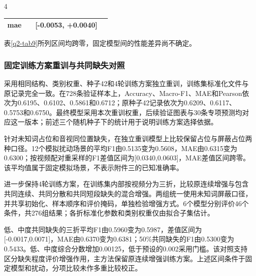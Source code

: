 \begin{PaperTable}{4}
\begin{table}[!htbp]
\begin{tabular}{@{}llll@{}}
\begin{minipage}[t]{\dimexpr 0.170000\linewidth-1.020000\tabcolsep\relax}
mae\strut
\end{minipage} & \begin{minipage}[t]{\dimexpr 0.160000\linewidth-0.960000\tabcolsep\relax}\raggedleft
-0.0007\strut
\end{minipage} & \begin{minipage}[t]{\dimexpr 0.380000\linewidth-2.280000\tabcolsep\relax}\raggedright
{[}-0.0053, +0.0040{]}\strut
\end{minipage}\tabularnewline
\bottomrule
\end{tabular}
\end{table}

\end{PaperTable}

表\ref{q2-tab9}所列区间均跨零，固定模型间的性能差异尚不确定。

\hypertarget{q2-ux56faux5b9aux8badux7ec3ux65b9ux6848ux91cdux8badux4e0eux5171ux540cux7f3aux5931ux5bf9ux7167}{%
\subsubsection{固定训练方案重训与共同缺失对照}\label{q2-ux56faux5b9aux8badux7ec3ux65b9ux6848ux91cdux8badux4e0eux5171ux540cux7f3aux5931ux5bf9ux7167}}

采用相同结构、类别权重、种子42和4轮训练方案独立重训，训练集标准化文件与原记录完全一致。在728条验证样本上，Accuracy、Macro-F1、MAE和Pearson依次为0.6195、0.6102、0.5861和0.6712；原种子42记录依次为0.6209、0.6117、0.5753和0.6750。最终模型采用本次重训权重，后续验证图表与30条专项预测均对应这一版本；前述三个随机种子下的统计用于说明训练方案选择依据。

针对未知词占位和音视同位置缺失，在独立重训模型上比较保留占位与屏蔽占位两种口径。12个模拟扰动场景的平均F1由0.5135变为0.5608，MAE由0.6315变为0.6300；按视频配对重采样的F1差值区间为{[}0.0340,0.0603{]}，MAE差值区间跨零。该平均值属于固定模拟场景，不表示附件三的已知准确率。

进一步保持4轮训练方案，在训练集内部按视频分为三折，比较原连续增强与包含共同连续、共同分散和共同短段缺失的混合增强。两组统一使用未知词屏蔽口径，并共享初始化、样本顺序和评价掩码，单独检验增强方式。6个模型分别评价46个条件，共276组结果；各折标准化参数和类别权重仅由拟合子集估计。

低、中度共同缺失的三折平均F1由0.5960变为0.5987，差值区间为{[}-0.0017,0.0071{]}，MAE由0.6370变为0.6381；50\%共同缺失的F1由0.5300变为0.5433。低、中度综合分数增加0.00125，低于预设的0.002采用门槛。该对照支持区分缺失程度评价增强作用，主方法保留原连续增强训练方案。上述区间条件于固定模型和扰动，分项比较未作多重比较校正。

